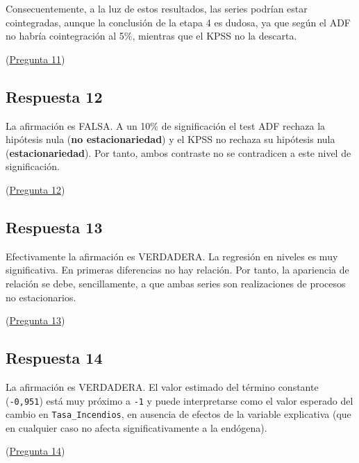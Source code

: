 \documentclass[10pt]{article}
\begin{document}
Consecuentemente, a la luz de estos resultados, las series podrían estar cointegradas, aunque la conclusión de la etapa 4 es dudosa, ya que según el ADF no habría cointegración al 5\%, mientras que el KPSS no la descarta.

(\hyperref[sec:orgc7a6e69]{Pregunta 11})
\subsection*{Respuesta 12}
\label{sec:org03606a8}

La afirmación es FALSA. A un 10\% de significación el test ADF rechaza la hipótesis nula (\textbf{no estacionariedad}) y el KPSS no rechaza su hipótesis nula (\textbf{estacionariedad}). Por tanto, ambos contraste no se contradicen a este nivel de significación.

(\hyperref[sec:orgb63c23f]{Pregunta 12})
\subsection*{Respuesta 13}
\label{sec:org178a5b6}

Efectivamente la afirmación es VERDADERA. La regresión en niveles es muy significativa. En primeras diferencias no hay relación. Por tanto, la apariencia de relación se debe, sencillamente, a que ambas series son realizaciones de procesos no estacionarios.

(\hyperref[sec:org138ff23]{Pregunta 13})
\subsection*{Respuesta 14}
\label{sec:org6c82b00}

La afirmación es VERDADERA. El valor estimado del término constante (\texttt{-0,951}) está muy próximo a \texttt{-1} y puede interpretarse como el valor esperado del cambio en \texttt{Tasa\_Incendios}, en ausencia de efectos de la variable explicativa (que en cualquier caso no afecta significativamente a la endógena).

(\hyperref[sec:org663bf1c]{Pregunta 14})
\end{document}

